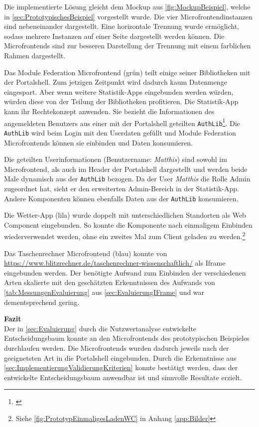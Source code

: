 Die implementierte Lösung gleicht dem Mockup aus \cref{fig:MockupBeispiel}, welche in \cref{sec:PrototypischesBeispiel} vorgestellt wurde. Die vier Microfrontendinstanzen sind nebeneinander dargestellt. Eine horizontale Trennung wurde ermöglicht, sodass mehrere Instanzen auf einer Seite dargestellt werden können. Die Microfrontends sind zur besseren Darstellung der Trennung mit einem farblichen Rahmen dargestellt.

Das Module Federation Microfrontend (grün) teilt einige seiner Bibliotheken mit der Portalshell. Zum jetzigen Zeitpunkt wird dadurch kaum Datenmenge eingespart. Aber wenn weitere Statistik-Apps eingebunden werden würden, würden diese von der Teilung der Bibliotheken profitieren. Die Statistik-App kann ihr Rechtekonzept anwenden. Sie bezieht die Informationen des angemeldeten Benutzers aus einer mit der Portalshell geteilten \texttt{AuthLib}\footnote{\cite[Sourcecode unter][]{Steyer2021f}}. Die \texttt{AuthLib} wird beim Login mit den Userdaten gefüllt und Module Federation Microfrontends können sie einbinden und Daten konsumieren.

Die geteilten Userinformationen (Benutzername: \textit{Matthis}) sind sowohl im Microfrontend, als auch im Header der Portalshell dargestellt und werden beide Male dynamisch aus der \texttt{AuthLib} bezogen. Da der User \textit{Matthis} die Rolle Admin zugeordnet hat, sieht er den erweiterten Admin-Bereich in der Statistik-App. Andere Komponenten können ebenfalls Daten aus der \texttt{AuthLib} konsumieren.

Die Wetter-App (lila) wurde doppelt mit unterschiedlichen Standorten als Web Component eingebunden. So konnte die Komponente nach einmaligem Einbinden wiederverwendet werden, ohne ein zweites Mal zum Client geladen zu werden.\footnote{Siehe \cref{fig:PrototypEinmaligesLadenWC} in Anhang \ref{app:Bilder}}

Das Taschenrechner Microfrontend (blau) konnte von \url{https://www.blitzrechner.de/taschenrechner-wissenschaftlich/} als Iframe eingebunden werden. Der benötigte Aufwand zum Einbinden der verschiedenen Arten skalierte mit den geschätzten Erkenntnissen des Aufwands von \cref{tab:MessungenEvaluierung} aus \cref{sec:EvaluierungIFrame} und war dementsprechend gering.

\textbf{Fazit}\\
Der in \cref{sec:Evaluierung} durch die Nutzwertanalyse entwickelte Entscheidungsbaum konnte an den Microfrontends des prototypischen Beispieles durchlaufen werden. Die Microfrontends wurden dadurch jeweils nach der geeignetsten Art in die Portalshell eingebunden. Durch die Erkenntnisse aus \cref{sec:ImplementierungValidierungKriterien} konnte bestätigt werden, dass der entwickelte Entscheidungsbaum anwendbar ist und sinnvolle Resultate erzielt.